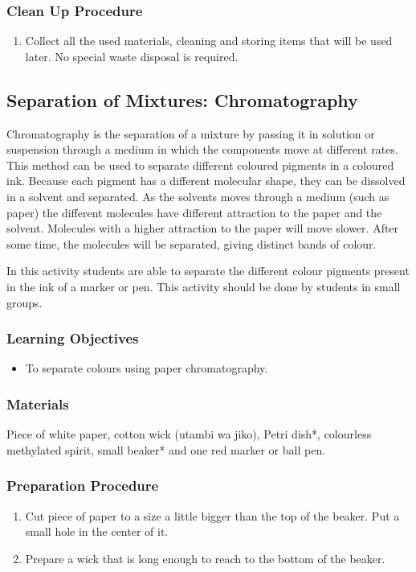 \subsubsection*{Clean Up Procedure}
\begin{enumerate}
\item{Collect all the used materials, cleaning and storing items that will be used later. No special waste disposal is required.}
\end{enumerate}


\subsection{Separation of Mixtures: Chromatography}
Chromatography is the separation of a mixture by passing it in solution or suspension through a medium in which the components move at different rates. This method can be used to separate different coloured pigments in a coloured ink. Because each pigment has a different molecular shape, they can be dissolved in a solvent and separated. As the solvents moves through a medium (such as paper) the different molecules have different attraction to the paper and the solvent. Molecules with a higher attraction to the paper will move slower. After some time, the molecules will be separated, giving distinct bands of colour.

In this activity students are able to separate the different colour pigments present in the ink of a marker or pen. This activity should be done by students in small groups.
\subsubsection*{Learning Objectives}
\begin{itemize}

\item{To separate colours using paper chromatography.}

\end{itemize}

\subsubsection*{Materials}
Piece of white paper, cotton wick (utambi wa jiko), Petri dish*, colourless methylated spirit, small beaker* and one red marker or ball pen.

\subsubsection*{Preparation Procedure}
\begin{enumerate}
\item{Cut piece of paper to a size a little bigger than the top of the beaker. Put a small hole in the center of it.}
\item{Prepare a wick that is long enough to reach to the bottom of the beaker.}
\end{enumerate}

